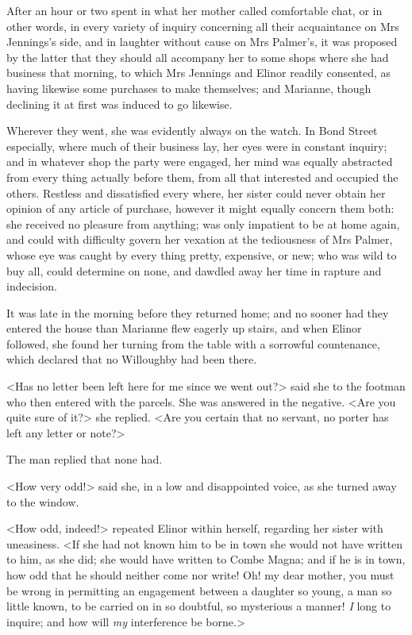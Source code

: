 After an hour or two spent in what her mother called comfortable chat, or in other words, in every variety of inquiry concerning all their acquaintance on Mrs Jennings's side, and in laughter without cause on Mrs Palmer's, it was proposed by the latter that they should all accompany her to some shops where she had business that morning, to which Mrs Jennings and Elinor readily consented, as having likewise some purchases to make themselves; and Marianne, though declining it at first was induced to go likewise.

Wherever they went, she was evidently always on the watch. In Bond Street especially, where much of their business lay, her eyes were in constant inquiry; and in whatever shop the party were engaged, her mind was equally abstracted from every thing actually before them, from all that interested and occupied the others. Restless and dissatisfied every where, her sister could never obtain her opinion of any article of purchase, however it might equally concern them both: she received no pleasure from anything; was only impatient to be at home again, and could with difficulty govern her vexation at the tediousness of Mrs Palmer, whose eye was caught by every thing pretty, expensive, or new; who was wild to buy all, could determine on none, and dawdled away her time in rapture and indecision.

It was late in the morning before they returned home; and no sooner had they entered the house than Marianne flew eagerly up stairs, and when Elinor followed, she found her turning from the table with a sorrowful countenance, which declared that no Willoughby had been there.

<Has no letter been left here for me since we went out?> said she to the footman who then entered with the parcels. She was answered in the negative. <Are you quite sure of it?> she replied. <Are you certain that no servant, no porter has left any letter or note?>

The man replied that none had.

<How very odd!> said she, in a low and disappointed voice, as she turned away to the window.

<How odd, indeed!> repeated Elinor within herself, regarding her sister with uneasiness. <If she had not known him to be in town she would not have written to him, as she did; she would have written to Combe Magna; and if he is in town, how odd that he should neither come nor write! Oh! my dear mother, you must be wrong in permitting an engagement between a daughter so young, a man so little known, to be carried on in so doubtful, so mysterious a manner! \textit{I} long to inquire; and how will \textit{my} interference be borne.>

